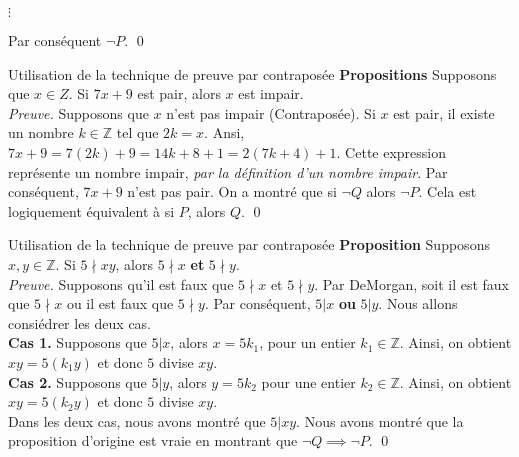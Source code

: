 \documentclass[16pt]{report}
\begin{document}
\begin{multicols*}{2}
\begin{center}
{{                    \hspace{1em} \(\vdots\) %

                    \vspace{0.5em} %
                    \noindent Par conséquent \( \neg P \). \qed
                }%
            }
            \end{center}


                    

            \begin{Preuve}{Utilisation de la technique de preuve par contraposée}{}
                \textbf{Propositions} \quad Supposons que $x \in Z$. Si $7x + 9$ est pair, alors $x$ est impair. 
                \vspace{1em}\\ 
                \textit{Preuve.} Supposons que $x$ n'est pas impair (Contraposée). Si $x$ est pair, il existe un 
                nombre $k \in \mathbb{Z}$ tel que $2k = x$. Ansi, $7x + 9 = 7(2k) + 9 = 14k + 8 + 1 = 2(7k + 4) +1$. 
                Cette expression représente un nombre impair, \textit{par la définition d'un nombre impair}. 
                Par conséquent, $7x + 9$ n'est pas pair. On a montré que si $\neg Q$ alors $\neg P$. 
                Cela est logiquement équivalent à si $P$, alors $Q$. \qed 

            \end{Preuve}


            \begin{Preuve}{Utilisation de la technique de preuve par contraposée}{}
                \textbf{Proposition} \quad Supposons $x, y \in \mathbb{Z}$. Si $ 5 \nmid xy$, alors  
                $5 \nmid x$ \textbf{et} $5 \nmid y$. 
                \vspace{1em} \\ 
                \textit{Preuve.} Supposons qu'il est faux que  $5 \nmid x$ et $5 \nmid y$. Par DeMorgan, soit il est faux 
                que $ 5 \nmid x$ ou il est faux que $5 \nmid y$. Par conséquent, $5 | x$ \textbf{ou} $5 |  y$.
                Nous allons consiédrer les deux cas. \\ 
                \textbf{Cas 1.} Supposons que $5 | x$, alors $x = 5k_1$, pour un entier $k_1 \in \mathbb{Z}$. Ainsi, 
                on obtient $xy = 5(k_1y)$ et donc $5$ divise $xy$. \\ 
                \textbf{Cas 2.} Supposons que $5 | y$, alors $y = 5k_2$ pour une entier $k_2 \in \mathbb{Z}$. Ainsi,
                on obtient $xy = 5(k_2y)$ et donc $5$ divise $xy$. \\ 
                Dans les deux cas, nous avons montré que $5 | xy$. Nous avons montré que la proposition d'origine est 
                vraie en montrant que $\neg Q \implies \neg P$. \qed  
            \end{Preuve}




\end{multicols*}
\end{document}
